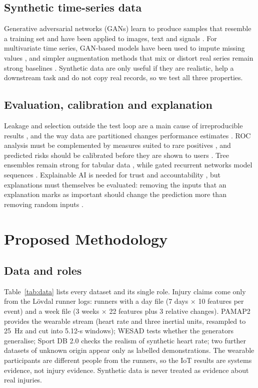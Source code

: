 \documentclass[12pt,a4paper]{article}
\begin{document}
\subsection{Synthetic time-series data}
Generative adversarial networks (GANs) learn to produce samples that resemble a training set and
have been applied to images, text and signals \citep{gui2023}. For multivariate time series,
GAN-based models have been used to impute missing values \citep{guo2019}, and simpler
augmentation methods that mix or distort real series remain strong baselines \citep{liu2024}.
Synthetic data are only useful if they are realistic, help a downstream task and do not copy
real records, so we test all three properties.

\subsection{Evaluation, calibration and explanation}
Leakage and selection outside the test loop are a main cause of irreproducible results
\citep{kapoor2023}, and the way data are partitioned changes performance estimates
\citep{wong2015}. ROC analysis \citep{fawcett2006} must be complemented by measures suited to
rare positives \citep{he2009}, and predicted risks should be calibrated before they are shown to
users \citep{vancalster2016}. Tree ensembles remain strong for tabular data
\citep{shwartzziv2022}, while gated recurrent networks model sequences \citep{greff2017}.
Explainable AI is needed for trust and accountability \citep{arrieta2020}, but explanations must
themselves be evaluated: removing the inputs that an explanation marks as important should change
the prediction more than removing random inputs \citep{samek2017,montavon2018}.

\section{Proposed Methodology}\label{sec:method}
\subsection{Data and roles}
Table~\ref{tab:data} lists every dataset and its single role. Injury claims come only from the
L\"ovdal runner logs: \lovdalRunners{} runners with a day file (7 days $\times$ 10 features per
event) and a week file (3 weeks $\times$ 22 features plus 3 relative changes). PAMAP2 provides the
wearable stream (heart rate and three inertial units, resampled to 25~Hz and cut into 5.12-s
windows); WESAD tests whether the generators generalise; Sport DB 2.0 checks the realism of
synthetic heart rate; two further datasets of unknown origin appear only as labelled
demonstrations. The wearable participants are different people from the runners, so the IoT
results are systems evidence, not injury evidence. Synthetic data is never treated as evidence
about real injuries.

\end{document}

